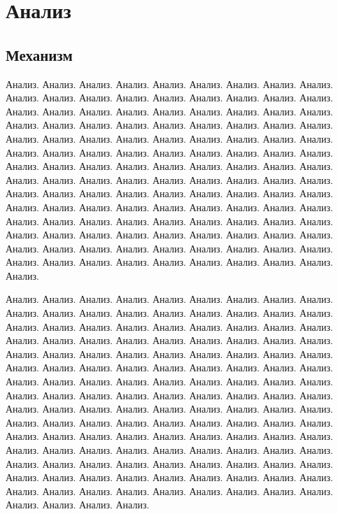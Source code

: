 \section{Анализ}

\subsection{Механизм}

Анализ. Анализ. Анализ. Анализ. Анализ. Анализ. Анализ. Анализ. Анализ. Анализ. Анализ.
Анализ. Анализ. Анализ. Анализ. Анализ.
Анализ. Анализ. Анализ. Анализ. Анализ. Анализ. Анализ. Анализ. Анализ. Анализ. Анализ.
Анализ. Анализ. Анализ. Анализ. Анализ.
Анализ. Анализ. Анализ. Анализ. Анализ. Анализ. Анализ. Анализ. Анализ. Анализ. Анализ.
Анализ. Анализ. Анализ. Анализ. Анализ.
Анализ. Анализ. Анализ. Анализ. Анализ. Анализ. Анализ. Анализ. Анализ. Анализ. Анализ.
Анализ. Анализ. Анализ. Анализ. Анализ.
Анализ. Анализ. Анализ. Анализ. Анализ. Анализ. Анализ. Анализ. Анализ. Анализ. Анализ.
Анализ. Анализ. Анализ. Анализ. Анализ.
Анализ. Анализ. Анализ. Анализ. Анализ. Анализ. Анализ. Анализ. Анализ. Анализ. Анализ.
Анализ. Анализ. Анализ. Анализ. Анализ.
Анализ. Анализ. Анализ. Анализ. Анализ. Анализ. Анализ. Анализ. Анализ. Анализ. Анализ.
Анализ. Анализ. Анализ. Анализ. Анализ.
Анализ. Анализ. Анализ. Анализ. Анализ. Анализ. Анализ. Анализ. Анализ. Анализ. Анализ.
Анализ. Анализ. Анализ. Анализ.

Анализ. Анализ. Анализ. Анализ. Анализ. Анализ. Анализ. Анализ. Анализ. Анализ. Анализ.
Анализ. Анализ. Анализ. Анализ. Анализ.
Анализ. Анализ. Анализ. Анализ. Анализ. Анализ. Анализ. Анализ. Анализ. Анализ. Анализ.
Анализ. Анализ. Анализ. Анализ. Анализ.
Анализ. Анализ. Анализ. Анализ. Анализ. Анализ. Анализ. Анализ. Анализ. Анализ. Анализ.
Анализ. Анализ. Анализ. Анализ. Анализ.
Анализ. Анализ. Анализ. Анализ. Анализ. Анализ. Анализ. Анализ. Анализ. Анализ. Анализ.
Анализ. Анализ. Анализ. Анализ. Анализ.
Анализ. Анализ. Анализ. Анализ. Анализ. Анализ. Анализ. Анализ. Анализ. Анализ. Анализ.
Анализ. Анализ. Анализ. Анализ. Анализ.
Анализ. Анализ. Анализ. Анализ. Анализ. Анализ. Анализ. Анализ. Анализ. Анализ. Анализ.
Анализ. Анализ. Анализ. Анализ. Анализ.
Анализ. Анализ. Анализ. Анализ. Анализ. Анализ. Анализ. Анализ. Анализ. Анализ. Анализ.
Анализ. Анализ. Анализ. Анализ. Анализ.
Анализ. Анализ. Анализ. Анализ. Анализ. Анализ. Анализ. Анализ. Анализ. Анализ. Анализ.
Анализ. Анализ. Анализ. Анализ. Анализ.
Анализ. Анализ. Анализ. Анализ. Анализ. Анализ. Анализ. Анализ. Анализ. Анализ. Анализ.


